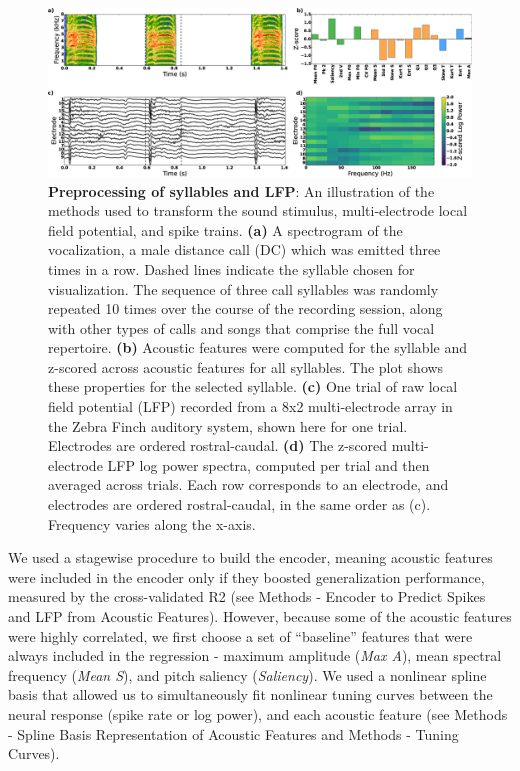 \begin{figure}
    \caption{\textbf{Preprocessing of syllables and LFP}: An illustration of the methods used to transform the sound stimulus, multi-electrode local field potential, and spike trains. \textbf{(a)} A spectrogram of the vocalization, a male distance call (DC) which was emitted three times in a row. Dashed lines indicate the syllable chosen for visualization. The sequence of three call syllables was randomly repeated 10 times over the course of the recording session, along with other types of calls and songs that comprise the full vocal repertoire. \textbf{(b)} Acoustic features were computed for the syllable and z-scored across acoustic features for all syllables. The plot shows these properties for the selected syllable. \textbf{(c)} One trial of raw local field potential (LFP) recorded from a 8x2 multi-electrode array in the Zebra Finch auditory system, shown here for one trial. Electrodes are ordered rostral-caudal. \textbf{(d)} The z-scored multi-electrode LFP log power spectra, computed per trial and then averaged across trials. Each row corresponds to an electrode, and electrodes are ordered rostral-caudal, in the same order as (c). Frequency varies along the x-axis.
}
    \centering
    \includegraphics[scale=0.25]{figure4.eps}
\end{figure}

We used a stagewise procedure to build the encoder, meaning acoustic features were included in the encoder only if they boosted generalization performance, measured by the cross-validated R2 (see Methods - Encoder to Predict Spikes and LFP from Acoustic Features). However, because some of the acoustic features were highly correlated, we first choose a set of “baseline” features that were always included in the regression - maximum amplitude ({\em Max A}), mean spectral frequency ({\em Mean S}), and pitch saliency ({\em Saliency}). We used a nonlinear spline basis that allowed us to simultaneously fit nonlinear tuning curves between the neural response (spike rate or log power), and each acoustic feature (see Methods - Spline Basis Representation of Acoustic Features and Methods - Tuning Curves).

